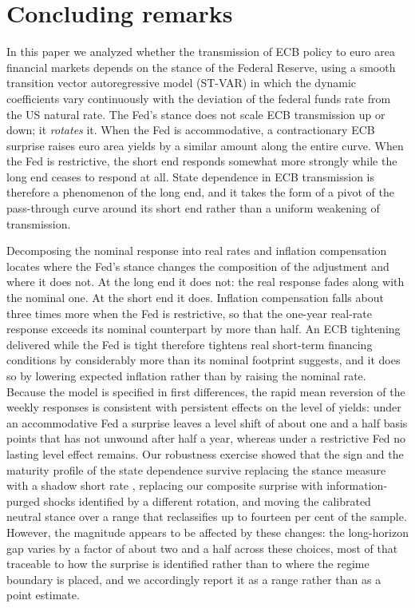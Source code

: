 \section{Concluding remarks}\label{sec:conclusio}

In this paper we analyzed whether the transmission of ECB policy to euro area financial markets depends on the stance of the Federal Reserve, using a smooth transition vector autoregressive model (ST-VAR) in which the dynamic coefficients vary continuously with the deviation of the federal funds rate from the US natural rate. The Fed's stance does not scale ECB transmission up or down; it \textit{rotates} it. When the Fed is accommodative, a contractionary ECB surprise raises euro area yields by a similar amount along the entire curve. When the Fed is restrictive, the short end responds somewhat more strongly while the long end ceases to respond at all. State dependence in ECB transmission is therefore a phenomenon of the long end, and it takes the form of a pivot of the pass-through curve around its short end rather than a uniform weakening of transmission.

Decomposing the nominal response into real rates and inflation compensation locates where the Fed's stance changes the composition of the adjustment and where it does not. At the long end it does not: the real response fades along with the nominal one. At the short end it does. Inflation compensation falls about three times more when the Fed is restrictive, so that the one-year real-rate response exceeds its nominal counterpart by more than half. An ECB tightening delivered while the Fed is tight therefore tightens real short-term financing conditions by considerably more than its nominal footprint suggests, and it does so by lowering expected inflation rather than by raising the nominal rate. Because the model is specified in first differences, the rapid mean reversion of the weekly responses is consistent with persistent effects on the level of yields: under an accommodative Fed a surprise leaves a level shift of about one and a half basis points that has not unwound after half a year, whereas under a restrictive Fed no lasting level effect remains.
Our robustness exercise showed that the sign and the maturity profile of the state dependence survive replacing the stance measure with a shadow short rate , replacing our composite surprise with information-purged shocks identified by a different rotation, and moving the calibrated neutral stance over a range that reclassifies up to fourteen per cent of the sample. However, the magnitude appears to be affected by these changes: the long-horizon gap varies by a factor of about two and a half across these choices, most of that traceable to how the surprise is identified rather than to where the regime boundary is placed, and we accordingly report it as a range rather than as a point estimate. 

